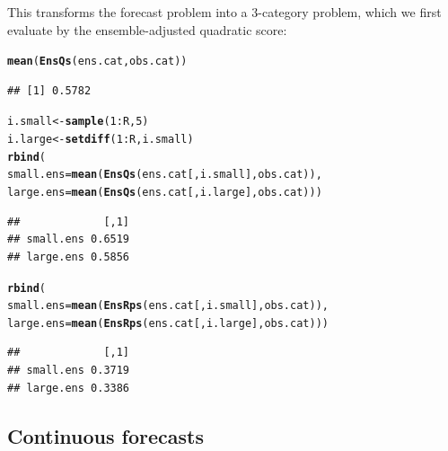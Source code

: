 \documentclass[article]{jss}\usepackage{graphicx, color}
\makeatletter
\newcommand{\hlfunctioncall}[1]{\textcolor[rgb]{0,0.501960784313725,0.752941176470588}{\textbf{#1}}}%
\newenvironment{kframe}{%
 \def\at@end@of@kframe{}%
 \ifinner\ifhmode%
  \def\at@end@of@kframe{\end{minipage}}%
  \begin{minipage}{\columnwidth}%
 \fi\fi%
 \def\FrameCommand##1{\hskip\@totalleftmargin \hskip-\fboxsep
 \colorbox{shadecolor}{##1}\hskip-\fboxsep
     \hskip-\linewidth \hskip-\@totalleftmargin \hskip\columnwidth}%
 \MakeFramed {\advance\hsize-\width
   \@totalleftmargin\z@ \linewidth\hsize
   \@setminipage}}%
 {\par\unskip\endMakeFramed%
 \at@end@of@kframe}
\newenvironment{knitrout}{}{} %
\makeatother
\begin{document}
This transforms the forecast problem into a 3-category problem, which we first evaluate by the ensemble-adjusted quadratic score:

\begin{knitrout}
\color{fgcolor}\begin{kframe}
\begin{alltt}
\hlfunctioncall{mean}(\hlfunctioncall{EnsQs}(ens.cat, obs.cat))
\end{alltt}
\begin{verbatim}
## [1] 0.5782
\end{verbatim}
\end{kframe}
\end{knitrout}


\begin{knitrout}
\color{fgcolor}\begin{kframe}
\begin{alltt}
i.small <- \hlfunctioncall{sample}(1:R, 5)
i.large <- \hlfunctioncall{setdiff}(1:R, i.small)
\hlfunctioncall{rbind}(
small.ens=\hlfunctioncall{mean}(\hlfunctioncall{EnsQs}(ens.cat[, i.small], obs.cat)),
large.ens=\hlfunctioncall{mean}(\hlfunctioncall{EnsQs}(ens.cat[, i.large], obs.cat)))
\end{alltt}
\begin{verbatim}
##             [,1]
## small.ens 0.6519
## large.ens 0.5856
\end{verbatim}
\end{kframe}
\end{knitrout}



\begin{knitrout}
\color{fgcolor}\begin{kframe}
\begin{alltt}
\hlfunctioncall{rbind}(
small.ens=\hlfunctioncall{mean}(\hlfunctioncall{EnsRps}(ens.cat[, i.small], obs.cat)),
large.ens=\hlfunctioncall{mean}(\hlfunctioncall{EnsRps}(ens.cat[, i.large], obs.cat)))
\end{alltt}
\begin{verbatim}
##             [,1]
## small.ens 0.3719
## large.ens 0.3386
\end{verbatim}
\end{kframe}
\end{knitrout}




\subsection{Continuous forecasts}
\end{document}
